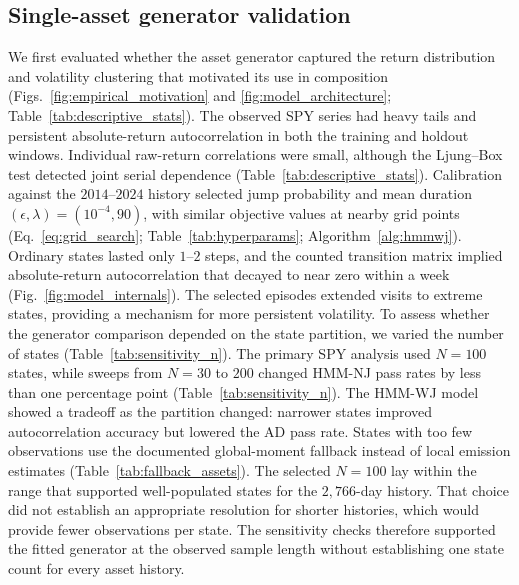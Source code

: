 \subsection{Single-asset generator validation}

We first evaluated whether the asset generator captured the return
distribution and volatility clustering that motivated its use in
composition (Figs.~\ref{fig:empirical_motivation} and
\ref{fig:model_architecture}; Table~\ref{tab:descriptive_stats}). The observed SPY series had heavy tails
and persistent absolute-return autocorrelation in both the training
and holdout windows. Individual raw-return correlations were small,
although the Ljung--Box test detected joint serial dependence
(Table~\ref{tab:descriptive_stats}). Calibration against the
$2014$--$2024$ history selected jump probability and mean duration
$(\epsilon,\lambda)=(10^{-4},90)$, with similar objective values at
nearby grid points (Eq.~\eqref{eq:grid_search};
Table~\ref{tab:hyperparams}; Algorithm~\ref{alg:hmmwj}). Ordinary
states lasted only $1$--$2$ steps, and the counted transition matrix
implied absolute-return autocorrelation that decayed to near zero
within a week (Fig.~\ref{fig:model_internals}). The selected episodes
extended visits to extreme states, providing a mechanism for more
persistent volatility.
To assess whether the generator comparison depended on the state
partition, we varied the number of states
(Table~\ref{tab:sensitivity_n}). The primary SPY analysis used $N=100$ states, while
sweeps from $N=30$ to $200$ changed HMM-NJ pass rates by less than
one percentage point (Table~\ref{tab:sensitivity_n}). The HMM-WJ
model showed a tradeoff as the partition changed: narrower states
improved autocorrelation accuracy but lowered the AD pass rate.
States with too few observations use the documented global-moment
fallback instead of local emission estimates
(Table~\ref{tab:fallback_assets}). The selected
$N=100$ lay within the range that supported well-populated states
for the $2{,}766$-day history. That choice did not establish an
appropriate resolution for shorter histories, which would provide
fewer observations per state. The sensitivity checks therefore
supported the fitted generator at the observed sample length without
establishing one state count for every asset history.


